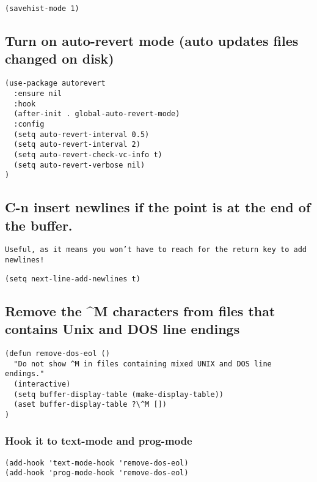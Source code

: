 \documentclass[11pt]{article}
\begin{document}
\begin{verbatim}
(savehist-mode 1)
\end{verbatim}

\subsection*{Turn on auto-revert mode (auto updates files changed on disk)}
\label{sec:orga5af9d1}

\begin{verbatim}
(use-package autorevert
  :ensure nil
  :hook
  (after-init . global-auto-revert-mode)
  :config
  (setq auto-revert-interval 0.5)
  (setq auto-revert-interval 2)
  (setq auto-revert-check-vc-info t)
  (setq auto-revert-verbose nil)
)
\end{verbatim}

\subsection*{C-n insert newlines if the point is at the end of the buffer.}
\label{sec:org008816a}

\begin{verbatim}
Useful, as it means you won’t have to reach for the return key to add newlines!
\end{verbatim}

\begin{verbatim}
(setq next-line-add-newlines t)
\end{verbatim}

\subsection*{Remove the \^{}M characters from files that contains Unix and DOS line endings}
\label{sec:org7c61946}

\begin{verbatim}
(defun remove-dos-eol ()
  "Do not show ^M in files containing mixed UNIX and DOS line endings."
  (interactive)
  (setq buffer-display-table (make-display-table))
  (aset buffer-display-table ?\^M [])
)
\end{verbatim}

\subsubsection*{Hook it to text-mode and prog-mode}
\label{sec:orga9239ff}
\begin{verbatim}
(add-hook 'text-mode-hook 'remove-dos-eol)
(add-hook 'prog-mode-hook 'remove-dos-eol)
\end{verbatim}
\end{document}
